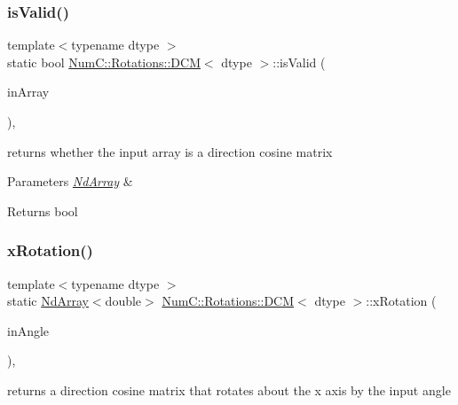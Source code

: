 \subsubsection{\texorpdfstring{is\+Valid()}{isValid()}}
{\footnotesize\ttfamily template$<$typename dtype $>$ \\
static bool \mbox{\hyperlink{class_num_c_1_1_rotations_1_1_d_c_m}{Num\+C\+::\+Rotations\+::\+D\+CM}}$<$ dtype $>$\+::is\+Valid (\begin{DoxyParamCaption}\item[{const \mbox{\hyperlink{class_num_c_1_1_nd_array}{Nd\+Array}}$<$ dtype $>$ \&}]{in\+Array }\end{DoxyParamCaption})\hspace{0.3cm}{\ttfamily [inline]}, {\ttfamily [static]}}

returns whether the input array is a direction cosine matrix


\begin{DoxyParams}{Parameters}
{\em \mbox{\hyperlink{class_num_c_1_1_nd_array}{Nd\+Array}}} & \\
\hline
\end{DoxyParams}
\begin{DoxyReturn}{Returns}
bool 
\end{DoxyReturn}
\mbox{\label{class_num_c_1_1_rotations_1_1_d_c_m_a27ccd9d9cd240719db8591411c83483f}} 
\subsubsection{\texorpdfstring{x\+Rotation()}{xRotation()}}
{\footnotesize\ttfamily template$<$typename dtype $>$ \\
static \mbox{\hyperlink{class_num_c_1_1_nd_array}{Nd\+Array}}$<$double$>$ \mbox{\hyperlink{class_num_c_1_1_rotations_1_1_d_c_m}{Num\+C\+::\+Rotations\+::\+D\+CM}}$<$ dtype $>$\+::x\+Rotation (\begin{DoxyParamCaption}\item[{double}]{in\+Angle }\end{DoxyParamCaption})\hspace{0.3cm}{\ttfamily [inline]}, {\ttfamily [static]}}

returns a direction cosine matrix that rotates about the x axis by the input angle



